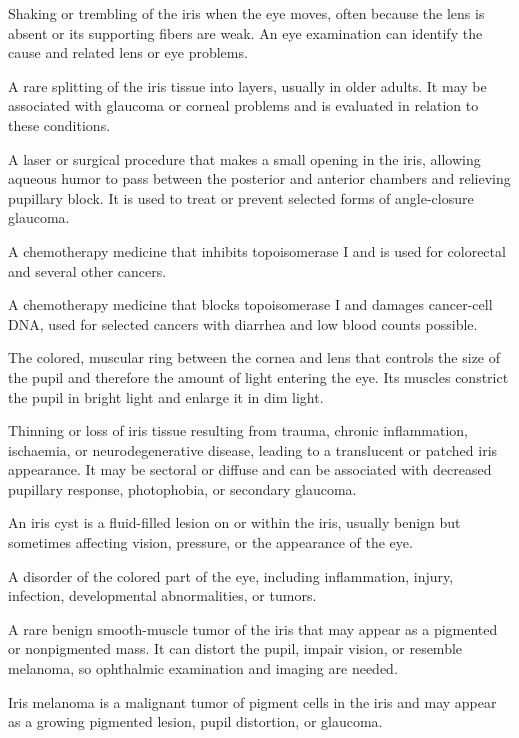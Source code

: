  Shaking or trembling of the iris when the eye moves, often because the lens is absent or its supporting fibers are weak. An eye examination can identify the cause and related lens or eye problems.

 A rare splitting of the iris tissue into layers, usually in older adults. It may be associated with glaucoma or corneal problems and is evaluated in relation to these conditions.

 A laser or surgical procedure that makes a small opening in the iris, allowing aqueous humor to pass between the posterior and anterior chambers and relieving pupillary block. It is used to treat or prevent selected forms of angle-closure glaucoma.

 A chemotherapy medicine that inhibits topoisomerase I and is used for colorectal and several other cancers.

 A chemotherapy medicine that blocks topoisomerase I and damages cancer-cell DNA, used for selected cancers with diarrhea and low blood counts possible.

 The colored, muscular ring between the cornea and lens that controls the size of the pupil and therefore the amount of light entering the eye. Its muscles constrict the pupil in bright light and enlarge it in dim light.

 Thinning or loss of iris tissue resulting from trauma, chronic inflammation, ischaemia,
or neurodegenerative disease, leading to a translucent or patched iris appearance. It
may be sectoral or diffuse and can be associated with decreased pupillary response,
photophobia, or secondary glaucoma.

 An iris cyst is a fluid-filled lesion on or within the iris, usually benign but sometimes affecting vision, pressure, or the appearance of the eye.

 A disorder of the colored part of the eye, including inflammation, injury, infection, developmental abnormalities, or tumors.

 A rare benign smooth-muscle tumor of the iris that may appear as a pigmented or nonpigmented mass. It can distort the pupil, impair vision, or resemble melanoma, so ophthalmic examination and imaging are needed.

 Iris melanoma is a malignant tumor of pigment cells in the iris and may appear as a growing pigmented lesion, pupil distortion, or glaucoma.

